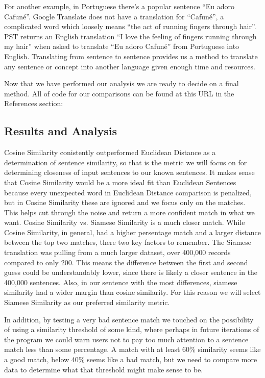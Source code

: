 \documentclass[runningheads]{llncs}
\begin{document}
	For another example, in Portuguese there's a popular sentence ``Eu adoro Cafuné''. Google Translate does not have a translation for ``Cafuné'', a complicated word which loosely means ``the act of running fingers through hair''. PST returns an English translation ``I love the feeling of fingers running through my hair'' when asked to translate ``Eu adoro Cafuné'' from Portuguese into English. Translating from sentence to sentence provides us a method to translate any sentence or concept into another language given enough time and resources.

	Now that we have performed our analysis we are ready to decide on a final method. All of code for our comparisons can be found at this URL in the References section: ~\cite{ref_url20}
	
	\subsection{Results and Analysis}
	Cosine Similarity conistently outperformed Euclidean Distance as a determination of sentence similarity, so that is the metric we will focus on for determining closeness of input sentences to our known sentences. It makes sense that Cosine Similarity would be a more ideal fit than Euclidean Sentences because every unexpected word in Euclidean Distance comparison is penalized, but in Cosine Similarity these are ignored and we focus only on the matches. This helps cut through the noise and return a more confident match in what we want. 
	Cosine Similarity vs. Siamese Similarity is a much closer match. While Cosine Similarity, in general, had a higher persentage match and a larger distance between the top two matches, there two key factors to remember. The Siamese translation was pulling from a much larger dataset, over 400,000 records compared to only 200. This means the difference between the first and second guess could be understandably lower, since there is likely a closer sentence in the 400,000 sentences. Also, in our sentence with the most differences, siamese similarity had a wider margin than cosine similarity. For this reason we will select Siamese Similarity as our preferred similarity metric.

	In addition, by testing a very bad sentence match we touched on the possibility of using a similarity threshold of some kind, where perhaps in future iterations of the program we could warn users not to pay too much attention to a sentence match less than some percentage. A match with at least 60\% similarity seems like a good match, below 40\% seems like a bad match, but we need to compare more data to determine what that threshold might make sense to be.
\end{document}
